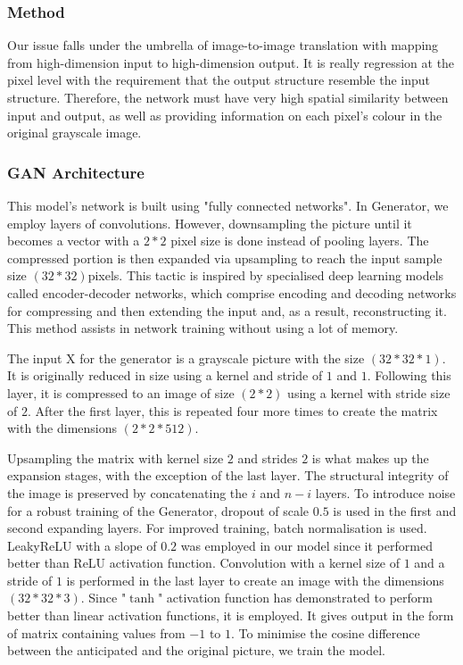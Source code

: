 \documentclass[conference]{IEEEtran}
\begin{document}
\subsubsection{Method}\label{Method}
Our issue falls under the umbrella of image-to-image translation with mapping from high-dimension input to high-dimension output. It is really regression at the pixel level with the requirement that the output structure resemble the input structure. Therefore, the network must have very high spatial similarity between input and output, as well as providing information on each pixel's colour in the original grayscale image.

\subsubsection{GAN Architecture}\label{GAN Architecture}
This model's network is built using "fully connected networks". In Generator, we employ layers of convolutions. However, downsampling the picture until it becomes a vector with a $2*2$ pixel size is done instead of pooling layers. The compressed portion is then expanded via upsampling to reach the input sample size $(32*32)$pixels. This tactic is inspired by specialised deep learning models called encoder-decoder networks, which comprise encoding and decoding networks for compressing and then extending the input and, as a result, reconstructing it. This method assists in network training without using a lot of memory. 

The input X for the generator is a grayscale picture with the size $(32*32*1)$. It is originally reduced in size using a kernel and stride of $1$ and $1$. Following this layer, it is compressed to an image of size $(2*2)$ using a kernel with stride size of $2$. After the first layer, this is repeated four more times to create the matrix with the dimensions $(2*2*512)$. 

Upsampling the matrix with kernel size $2$ and strides $2$ is what makes up the expansion stages, with the exception of the last layer. The structural integrity of the image is preserved by concatenating the $i$ and $n-i$ layers. To introduce noise for a robust training of the Generator, dropout of scale $0.5$ is used in the first and second expanding layers. For improved training, batch normalisation is used. LeakyReLU with a slope of $0.2$ was employed in our model since it performed better than ReLU activation function. Convolution with a kernel size of $1$ and a stride of $1$ is performed in the last layer to create an image with the dimensions $(32*32*3)$. Since "$\tanh$" activation function has demonstrated to perform better than linear activation functions, it is employed. It gives output in the form of matrix containing values from $-1$ to $1$. 
To minimise the cosine difference between the anticipated and the original picture, we train the model.
\end{document}
